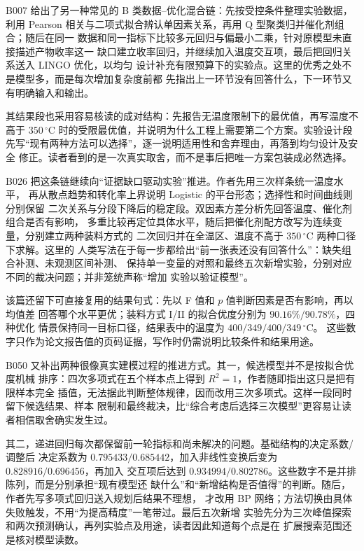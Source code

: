 \documentclass[UTF8,a4paper,12pt]{ctexart}
\begin{document}
B007 给出了另一种常见的 B 类数据--优化混合链：先按受控条件整理实验数据，利用
Pearson 相关与二项式拟合辨认单因素关系，再用 Q 型聚类归并催化剂组合；随后在同一
数据和同一指标下比较多元回归与偏最小二乘，针对原模型未直接描述产物收率这一
缺口建立收率回归，并继续加入温度交互项，最后把回归关系送入 LINGO 优化，以均匀
设计补充有限预算下的实验点。这里的优秀之处不是模型多，而是每次增加复杂度前都
先指出上一环节没有回答什么，下一环节又有明确输入和输出。

其结果段也采用容易核读的成对结构：先报告无温度限制下的最优值，再写温度不高于
$350\,^{\circ}\mathrm{C}$ 时的受限最优值，并说明为什么工程上需要第二个方案。实验设计段
先写“现有两种方法可以选择”，逐一说明适用性和舍弃理由，再落到均匀设计及安全
修正。读者看到的是一次真实取舍，而不是事后把唯一方案包装成必然选择。

B026 把这条链继续向“证据缺口驱动实验”推进。作者先用三次样条统一温度水平，
再从散点趋势和转化率上界说明 Logistic 的平台形态；选择性和时间曲线则分别保留
二次关系与分段下降后的稳定段。双因素方差分析先回答温度、催化剂组合是否有影响，
多重比较再定位具体水平，随后把催化剂配方改写为连续变量，分别建立两种装料方式的
二次回归并在全温区、温度不高于 $350\,^{\circ}\mathrm{C}$ 两种口径下求解。这里的
人类写法在于每一步都给出“前一张表还没有回答什么”：缺失组合补测、未观测区间补测、
保持单一变量的对照和最终五次新增实验，分别对应不同的裁决问题；并非笼统声称“增加
实验以验证模型”。

该篇还留下可直接复用的结果句式：先以 F 值和 $p$ 值判断因素是否有影响，再以均值差
回答哪个水平更优；装料方式 I/II 的拟合优度分别为 $90.16\%/90.78\%$，四种优化
情景保持同一目标口径，结果表中的温度为 $400/349/400/349\,^{\circ}\mathrm{C}$。
这些数字只作为论文报告值的页码证据，写作时仍需说明比较条件和结果用途。

B050 又补出两种很像真实建模过程的推进方式。其一，候选模型并不是按拟合优度机械
排序：四次多项式在五个样本点上得到 $R^2=1$，作者随即指出这只是把有限样本完全
插值，无法据此判断整体规律，因而改用三次多项式。这样一段同时留下候选结果、样本
限制和最终裁决，比“综合考虑后选择三次模型”更容易让读者相信取舍确实发生过。

其二，递进回归每次都保留前一轮指标和尚未解决的问题。基础结构的决定系数/调整后
决定系数为 $0.795433/0.685442$，加入非线性变换后变为 $0.828916/0.696456$，再加入
交互项后达到 $0.934994/0.802786$。这些数字不是并排陈列，而是分别承担“现有模型还
缺什么”和“新增结构是否值得”的判断。随后，作者先写多项式回归送入规划后结果不理想，
才改用 BP 网络；方法切换由具体失败触发，不用“为提高精度”一笔带过。最后五次新增
实验先分为三次峰值探索和两次预测确认，再列实验点及用途，读者因此知道每个点是在
扩展搜索范围还是核对模型读数。
\end{document}
